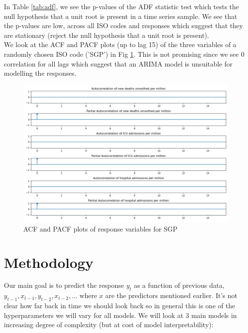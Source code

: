 \documentclass{article}
\begin{document}
In Table \ref{tab:adf}, we see the p-values of the ADF statistic test which tests the null hypothesis that a unit root is present in a time series sample. We see that the p-values are low, across all ISO codes and responses which suggest that they are stationary (reject the null hypothesis that a unit root is present). \\

We look at the ACF and PACF plots (up to lag 15) of the three variables of a randomly chosen ISO code ('SGP') in Fig \ref{fig:acf}. This is not promising since we see 0 correlation for all lags which suggest that an ARIMA model is unsuitable for modelling the responses.\\

\begin{figure}
\centering
\includegraphics[width=1\linewidth]{acf.png}
\caption{\label{fig:acf}ACF and PACF plots of response variables for SGP}
\end{figure}

\clearpage

\section{Methodology}


Our main goal is to predict the response $y_t$ as a function of previous data, $y_{t-1}, x_{t-1}, y_{t-2}, x_{t-2},...$ where $x$ are the predictors mentioned earlier. It's not clear how far back in time we should look back so in general this is one of the hyperparameters we will vary for all models. We will look at 3 main models  in increasing degree of complexity (but at cost of model interpretability):
\end{document}

